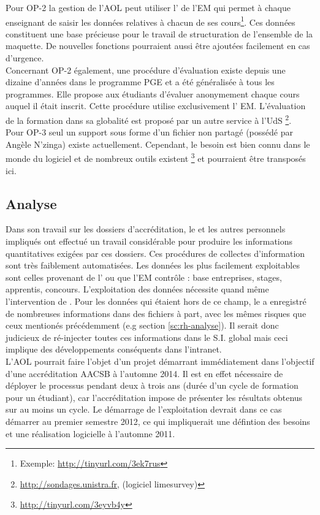 \documentclass{book}
\begin{document}
Pour OP-2 la gestion de l'AOL peut utiliser l' de l'EM qui
permet à chaque enseignant de saisir les données relatives à chacun de ses 
cours\footnote{Exemple: \url{http://tinyurl.com/3ek7rus}}. Ces données 
constituent une base précieuse pour le travail de structuration de l'ensemble
de la maquette. De nouvelles fonctions pourraient aussi être ajoutées facilement
en cas d'urgence.\\

Concernant OP-2 également, une procédure d'évaluation existe depuis une dizaine 
d'années dans le programme PGE et a été généralisée à tous les programmes. Elle 
propose aux étudiants d'évaluer anonymement chaque cours auquel il était inscrit. 
Cette procédure utilise exclusivement l' EM.
L'évaluation de la formation dans sa globalité est proposé par un autre service à l'UdS%
\footnote{\url{http://sondages.unistra.fr}, (logiciel limesurvey)}.\\

Pour OP-3 seul un support sous forme d'un fichier  non partagé (possédé par Angèle 
N'zinga) existe actuellement. Cependant, le besoin est
bien connu dans le monde du logiciel et de nombreux outils existent%
\footnote{\url{http://tinyurl.com/3eyvb4y}}
et pourraient être transposés ici.


\subsection{Analyse}
\label{sc:sop-analyse}

Dans son travail sur les dossiers d'accréditation, le \sop et les autres
personnels impliqués ont effectué un travail considérable pour produire
les informations quantitatives exigées par ces dossiers. Ces procédures
de collectes d'information sont très faiblement automatisées. Les données
les plus facilement exploitables sont celles provenant de l'
ou que l'EM contrôle : base entreprises, stages, apprentis, concours. 
L'exploitation des données nécessite quand même l'intervention de \CK. 
Pour les données qui étaient hors de ce champ, le \sop a enregistré de
nombreuses informations dans des fichiers à part, avec les mêmes risques
que ceux mentionés précédemment (e.g section \ref{sc:rh-analyse}). 
Il serait donc judicieux de ré-injecter toutes ces informations dans le S.I.
global mais ceci implique des développements conséquents dans l'intranet.\\


L'AOL pourrait faire l'objet d'un projet démarrant immédiatement dans
l'objectif d'une accréditation AACSB à l'automne 2014. Il est en effet 
nécessaire de déployer le processus pendant deux à trois ans (durée
d'un cycle de formation pour un étudiant), car l'accréditation impose de
présenter les résultats obtenus sur au moins un cycle. Le démarrage de
l'exploitation devrait dans ce cas démarrer au premier semestre 2012,
ce qui impliquerait une défintion des besoins et une réalisation logicielle
à l'automne 2011.
\end{document}
